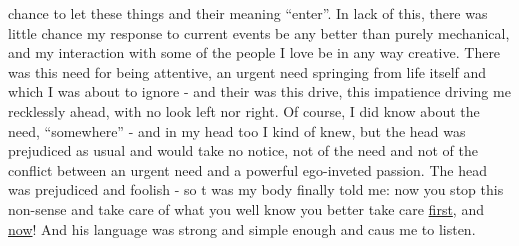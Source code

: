 
chance to let these things and their meaning ``enter''.  In lack of this,
there was little chance my response to current events   be any better
than purely mechanical,  and my interaction with some of the people I
love   be in any way creative.  There was this need for being attentive,
an urgent need springing from life itself and which I was about to ignore
-  and their was this drive,  this impatience driving me recklessly
ahead,  with no look left nor right.  Of course,  I did know about the
need, ``somewhere''  -  and in my head too I kind of knew,  but the head
was prejudiced as usual and would take no notice,  not of the need and
not of the conflict between an urgent need and a powerful\hand{,} 
ego-inveted passion.  The head was prejudiced and foolish  -  so t
was my body  finally  told me:  now you stop this non-sense and  take
care of what you well know you better take care \uline{first},  and \uline{now}!  And
his language was strong and simple enough and caus me to listen.

